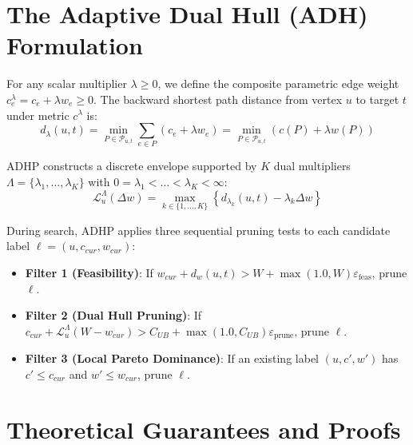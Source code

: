 \documentclass[11pt,a4paper]{article}
\begin{document}
\section{The Adaptive Dual Hull (ADH) Formulation}
For any scalar multiplier $\lambda \ge 0$, we define the composite parametric edge weight $c_e^\lambda = c_e + \lambda w_e \ge 0$. The backward shortest path distance from vertex $u$ to target $t$ under metric $c^\lambda$ is:
\begin{equation}
d_\lambda(u, t) = \min_{P \in \mathcal{P}_{u, t}} \sum_{e \in P} (c_e + \lambda w_e) = \min_{P \in \mathcal{P}_{u, t}} \left( c(P) + \lambda w(P) \right)
\end{equation}

ADHP constructs a discrete envelope supported by $K$ dual multipliers $\Lambda = \{\lambda_1, \dots, \lambda_K\}$ with $0 = \lambda_1 < \dots < \lambda_K < \infty$:
\begin{equation}
\mathcal{L}_u^\Lambda(\Delta w) = \max_{k \in \{1, \dots, K\}} \left\{ d_{\lambda_k}(u, t) - \lambda_k \Delta w \right\}
\end{equation}

During search, ADHP applies three sequential pruning tests to each candidate label $\ell = (u, c_{cur}, w_{cur})$:
\begin{itemize}
    \item \textbf{Filter 1 (Feasibility)}: If $w_{cur} + d_w(u, t) > W + \max(1.0, W)\varepsilon_{\text{feas}}$, prune $\ell$.
    \item \textbf{Filter 2 (Dual Hull Pruning)}: If $c_{cur} + \mathcal{L}_u^\Lambda(W - w_{cur}) > C_{UB} + \max(1.0, C_{UB})\varepsilon_{\text{prune}}$, prune $\ell$.
    \item \textbf{Filter 3 (Local Pareto Dominance)}: If an existing label $(u, c', w')$ has $c' \le c_{cur}$ and $w' \le w_{cur}$, prune $\ell$.
\end{itemize}

\section{Theoretical Guarantees and Proofs}
\end{document}
